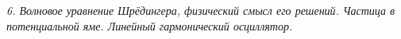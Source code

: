 \emph{6. Волновое уравнение Шрёдингера, физический смысл его решений. 
Частица в потенциальной яме. Линейный гармонический осциллятор.}

\newpage
